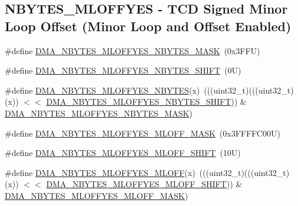 \subsection*{N\+B\+Y\+T\+E\+S\+\_\+\+M\+L\+O\+F\+F\+Y\+ES -\/ T\+CD Signed Minor Loop Offset (Minor Loop and Offset Enabled)}
\begin{DoxyCompactItemize}
\item 
\#define \mbox{\hyperlink{group___d_m_a___register___masks_ga83bbf68562a7ac3e45fb940a1a7f18f8}{D\+M\+A\+\_\+\+N\+B\+Y\+T\+E\+S\+\_\+\+M\+L\+O\+F\+F\+Y\+E\+S\+\_\+\+N\+B\+Y\+T\+E\+S\+\_\+\+M\+A\+SK}}~(0x3\+F\+F\+U)
\item 
\#define \mbox{\hyperlink{group___d_m_a___register___masks_ga30c39f4b863f96ab4563e05480f0c63e}{D\+M\+A\+\_\+\+N\+B\+Y\+T\+E\+S\+\_\+\+M\+L\+O\+F\+F\+Y\+E\+S\+\_\+\+N\+B\+Y\+T\+E\+S\+\_\+\+S\+H\+I\+FT}}~(0\+U)
\item 
\#define \mbox{\hyperlink{group___d_m_a___register___masks_gaab46ecd8c1a7d2849248ee5ea3271873}{D\+M\+A\+\_\+\+N\+B\+Y\+T\+E\+S\+\_\+\+M\+L\+O\+F\+F\+Y\+E\+S\+\_\+\+N\+B\+Y\+T\+ES}}(x)~(((uint32\+\_\+t)(((uint32\+\_\+t)(x)) $<$$<$ \mbox{\hyperlink{group___d_m_a___register___masks_ga30c39f4b863f96ab4563e05480f0c63e}{D\+M\+A\+\_\+\+N\+B\+Y\+T\+E\+S\+\_\+\+M\+L\+O\+F\+F\+Y\+E\+S\+\_\+\+N\+B\+Y\+T\+E\+S\+\_\+\+S\+H\+I\+FT}})) \& \mbox{\hyperlink{group___d_m_a___register___masks_ga83bbf68562a7ac3e45fb940a1a7f18f8}{D\+M\+A\+\_\+\+N\+B\+Y\+T\+E\+S\+\_\+\+M\+L\+O\+F\+F\+Y\+E\+S\+\_\+\+N\+B\+Y\+T\+E\+S\+\_\+\+M\+A\+SK}})
\item 
\#define \mbox{\hyperlink{group___d_m_a___register___masks_gac07412f8b58bca6703cf427a9ce2bbcb}{D\+M\+A\+\_\+\+N\+B\+Y\+T\+E\+S\+\_\+\+M\+L\+O\+F\+F\+Y\+E\+S\+\_\+\+M\+L\+O\+F\+F\+\_\+\+M\+A\+SK}}~(0x3\+F\+F\+F\+F\+C00\+U)
\item 
\#define \mbox{\hyperlink{group___d_m_a___register___masks_gaeebd8fdf6a54f6511b5bc65a6b139545}{D\+M\+A\+\_\+\+N\+B\+Y\+T\+E\+S\+\_\+\+M\+L\+O\+F\+F\+Y\+E\+S\+\_\+\+M\+L\+O\+F\+F\+\_\+\+S\+H\+I\+FT}}~(10\+U)
\item 
\#define \mbox{\hyperlink{group___d_m_a___register___masks_ga9f73c3351f2fff2e2c04b2a03fabd506}{D\+M\+A\+\_\+\+N\+B\+Y\+T\+E\+S\+\_\+\+M\+L\+O\+F\+F\+Y\+E\+S\+\_\+\+M\+L\+O\+FF}}(x)~(((uint32\+\_\+t)(((uint32\+\_\+t)(x)) $<$$<$ \mbox{\hyperlink{group___d_m_a___register___masks_gaeebd8fdf6a54f6511b5bc65a6b139545}{D\+M\+A\+\_\+\+N\+B\+Y\+T\+E\+S\+\_\+\+M\+L\+O\+F\+F\+Y\+E\+S\+\_\+\+M\+L\+O\+F\+F\+\_\+\+S\+H\+I\+FT}})) \& \mbox{\hyperlink{group___d_m_a___register___masks_gac07412f8b58bca6703cf427a9ce2bbcb}{D\+M\+A\+\_\+\+N\+B\+Y\+T\+E\+S\+\_\+\+M\+L\+O\+F\+F\+Y\+E\+S\+\_\+\+M\+L\+O\+F\+F\+\_\+\+M\+A\+SK}})

\end{DoxyCompactItemize}
